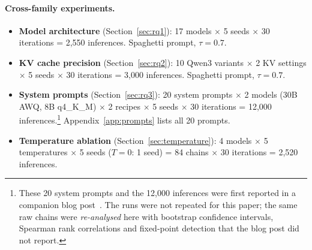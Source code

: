 \documentclass[11pt]{article}
\begin{document}
\paragraph{Cross-family experiments.}
\begin{itemize}[leftmargin=*]
  \item \textbf{Model architecture} (Section~\ref{sec:rq1}): 17 models
        $\times$ 5 seeds $\times$ 30 iterations = 2,550 inferences.
        Spaghetti prompt, $\tau=0.7$.
  \item \textbf{KV cache precision} (Section~\ref{sec:rq2}): 10 Qwen3 variants
        $\times$ 2 KV settings $\times$ 5 seeds $\times$ 30 iterations
        = 3,000 inferences. Spaghetti prompt, $\tau=0.7$.
  \item \textbf{System prompts} (Section~\ref{sec:rq3}): 20 system prompts
        $\times$ 2 models (30B AWQ, 8B q4\_K\_M) $\times$ 2 recipes
        $\times$ 5 seeds $\times$ 30 iterations = 12,000
        inferences.\footnote{These 20 system prompts and the 12{,}000
        inferences were first reported in a companion blog
        post~\citep{smith2026sysprompt}. The runs were not repeated
        for this paper; the same raw chains were \emph{re-analysed} here with
        bootstrap confidence intervals, Spearman rank correlations and
        fixed-point detection that the blog post did not report.}
        Appendix~\ref{app:prompts} lists all 20 prompts.
  \item \textbf{Temperature ablation} (Section~\ref{sec:temperature}):
        4 models $\times$ 5 temperatures $\times$ 5 seeds ($T=0$: 1 seed)
        = 84 chains $\times$ 30 iterations = 2,520 inferences.
\end{itemize}
\end{document}
